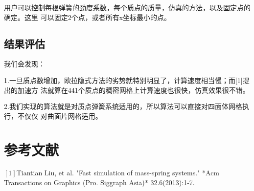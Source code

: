\documentclass{article}
\begin{document}
	用户可以控制每根弹簧的劲度系数，每个质点的质量，仿真的方法，以及固定点的确定。这里
	可以固定2个点，或者所有x坐标最小的点。
	\subsection{结果评估}
	我们会发现：
	
	1.一旦质点数增加，欧拉隐式方法的劣势就特别明显了，计算速度相当慢；而[1]提出的加速方
	法就算在441个质点的稠密网格上计算速度也很快，仿真效果很不错。
	
	2.我们实现的算法就是对质点弹簧系统适用的，所以算法可以直接对四面体网格执行，不仅仅
	对曲面片网格适用。
\section{参考文献}
  $[1]$Tiantian Liu, et al. "Fast simulation of mass-spring systems." *Acm 
  Transactions on Graphics (Pro. Siggraph Asia)* 32.6(2013):1-7.
\end{document}
